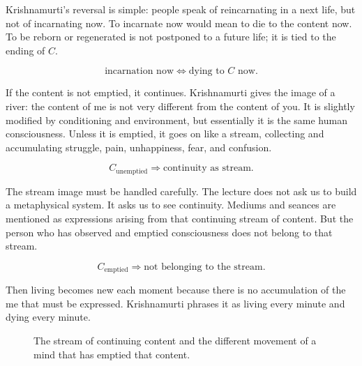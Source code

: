 Krishnamurti's reversal is simple: people speak of reincarnating in a next life, but not of incarnating now. To incarnate now would mean to die to the content now. To be reborn or regenerated is not postponed to a future life; it is tied to the ending of \(C\).

\begin{equation}
\text{incarnation now}
\Leftrightarrow
\text{dying to } C \text{ now}.
\end{equation}

If the content is not emptied, it continues. Krishnamurti gives the image of a river: the content of me is not very different from the content of you. It is slightly modified by conditioning and environment, but essentially it is the same human consciousness. Unless it is emptied, it goes on like a stream, collecting and accumulating struggle, pain, unhappiness, fear, and confusion.

\begin{equation}
C_{\text{unemptied}}
\Rightarrow
\text{continuity as stream}.
\end{equation}

The stream image must be handled carefully. The lecture does not ask us to build a metaphysical system. It asks us to see continuity. Mediums and seances are mentioned as expressions arising from that continuing stream of content. But the person who has observed and emptied consciousness does not belong to that stream.

\begin{equation}
C_{\text{emptied}}
\Rightarrow
\text{not belonging to the stream}.
\end{equation}

Then living becomes new each moment because there is no accumulation of the me that must be expressed. Krishnamurti phrases it as living every minute and dying every minute.

\begin{figure}
\centering
{}
\caption{The stream of continuing content and the different movement of a mind that has emptied that content.}
\end{figure}

